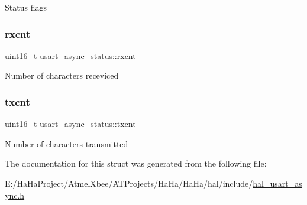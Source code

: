Status flags \mbox{\label{structusart__async__status_ac32698399322fed11e6914cbd88f5ee5}} 
\subsubsection{\texorpdfstring{rxcnt}{rxcnt}}
{\footnotesize\ttfamily uint16\+\_\+t usart\+\_\+async\+\_\+status\+::rxcnt}

Number of characters receviced \mbox{\label{structusart__async__status_a5680433094528c4ff7bcd49fba77e970}} 
\subsubsection{\texorpdfstring{txcnt}{txcnt}}
{\footnotesize\ttfamily uint16\+\_\+t usart\+\_\+async\+\_\+status\+::txcnt}

Number of characters transmitted 

The documentation for this struct was generated from the following file\+:\begin{DoxyCompactItemize}
\item 
E\+:/\+Ha\+Ha\+Project/\+Atmel\+Xbee/\+A\+T\+Projects/\+Ha\+Ha/\+Ha\+Ha/hal/include/\hyperlink{hal__usart__async_8h}{hal\+\_\+usart\+\_\+async.\+h}\end{DoxyCompactItemize}
